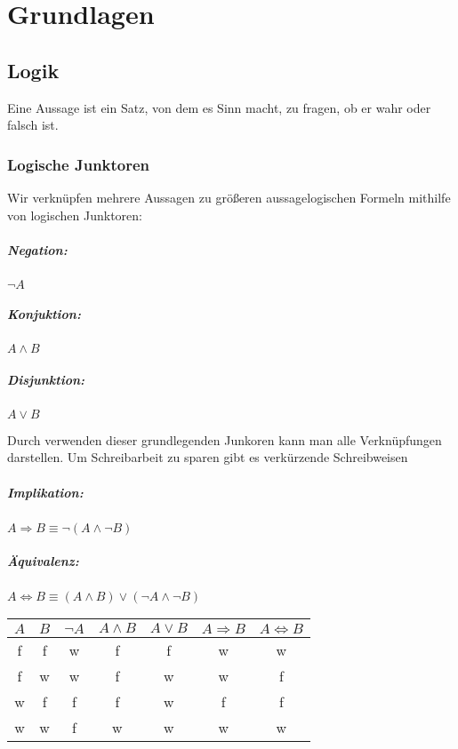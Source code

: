 \chapter{Grundlagen}
\section{Logik}
Eine Aussage ist ein Satz, von dem es Sinn macht, zu fragen, ob er wahr oder falsch ist.

\subsection{Logische Junktoren}
Wir verknüpfen mehrere Aussagen zu größeren aussagelogischen Formeln mithilfe von logischen Junktoren:
\begin{multicols}{3}
  \paragraph{Negation:}
  $\neg A$
  \columnbreak
  \paragraph{Konjuktion:}
  $A \wedge B$
  \columnbreak
  \paragraph{Disjunktion:}
  $A \vee B$
\end{multicols}
Durch verwenden dieser grundlegenden Junkoren kann man alle Verknüpfungen darstellen. Um Schreibarbeit zu sparen gibt es verkürzende Schreibweisen

\paragraph{Implikation:}
$A\Rightarrow B \equiv \neg(A\wedge \neg B)$
\paragraph{Äquivalenz:}
$A\Leftrightarrow B \equiv (A\wedge B)\vee (\neg A\wedge \neg B)$

\vspace{1em}
\begin{center}
  \begin{tabular}{c|c||c|c|c|c|c}
    $A$ & $B$ & $\neg A$ & $A \wedge B$ & $A \vee B$ & $A \Rightarrow B$ & $A \Leftrightarrow B$\\
    \hline  f & f & w & f & f & w & w \\
            f & w & w & f & w & w & f \\
            w & f & f & f & w & f & f \\
            w & w & f & w & w & w & w
  \end{tabular}
\end{center}



